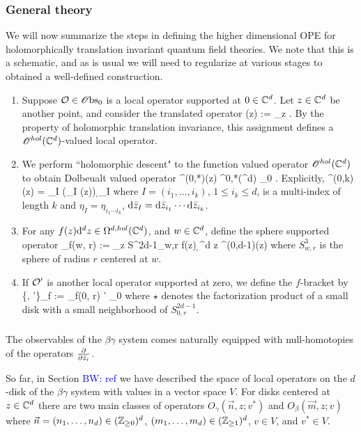 \documentclass[10pt]{amsart}
\def\brian{\textcolor{blue}{BW: }\textcolor{blue}}
\begin{document}
\subsubsection{General theory}

We will now summarize the steps in defining the higher dimensional OPE for holomorphically translation invariant quantum field theories. 
We note that this is a schematic, and as is usual we will need to regularize at various stages to obtained a well-defined construction. 

\begin{enumerate}
\item Suppose $\mathcal O \in {\mathscr O}{\rm bs}_0$ is a local operator supported at $0 \in \mathbb C^d$. 
Let $z \in \mathbb C^d$ be another point, and consider the translated operator 
\ben
\cO(z) := \tau_z \cO .
\een 
By the property of holomorphic translation invariance, this assignment defines a $\mathscr O^{hol}(\mathbb C^d)$-valued local operator. 

\item We perform ``holomorphic descent" to the function valued operator $\mathscr O^{hol}(\mathbb C^d)$ to obtain Dolbeualt valued operator 
\ben
\cO^{(0,*)}(z) \in \Omega^{0,*}(\CC^d) \tensor \sObs_0 .
\een 
Explicitly, 
\ben
\cO^{(0,k)} (z) = \sum_{I} (\Bar{\eta}_I \cdot \cO(z)) \d \zbar_I
\een
where $I = (i_1,\ldots,i_k)$, $1 \leq i_k \leq d$, is a multi-index of length $k$ and $\eta_I = \eta_{i_1\cdots i_k}$, ${\rm d} \Bar{z}_I = {\rm d} \Bar{z}_{i_1} \cdots {\rm d} \Bar{z}_{i_k}$. 

\item For any $f(z) {\rm d}^d z \in \Omega^{d,hol}(\mathbb C^d)$, and $w \in \mathbb C^d$, define the sphere supported operator
\ben
\cO_{f}(w, r) := \int_{z \in S^{2d-1}_{w,r}} f(z) \d^d z \cO^{(0,d-1)}(z)
\een 
where $S^3_{w,r}$ is the sphere of radius $r$ centered at $w$. 

\item If $\mathcal O'$ is another local operator supported at zero, we define the $f$-bracket by
\ben
\{\cO, \cO'\}_f := \cO_f(0, r) \star \cO' \in \sObs_0
\een
where $\star$ denotes the factorization product of a small disk with a small neighborhood of $S^{2d-1}_{0,r}$. 

\end{enumerate}

\subsubsection{}

The observables of the $\beta\gamma$ system comes naturally equipped with null-homotopies of the operators $\frac{\partial}{\partial \Bar{z}_i}$. 

So far, in Section \brian{ref} we have described the space of local operators on the $d$-disk of the $\beta\gamma$ system with values in a vector space $V$. 
For disks centered at $z \in \mathbb C^d$ there are two main classes of operators $O_\gamma (\vec{n}, z ; v^*)$ and $O_{\beta}(\vec{m}, z ; v)$ where $\vec{n} = (n_1,\ldots,n_d) \in (\mathbb Z_{\geq 0})^d$, $(m_1,\ldots,m_d) \in (\mathbb Z_{\geq 1})^d$, $v \in V$, and $v^* \in V$. 
\end{document}
